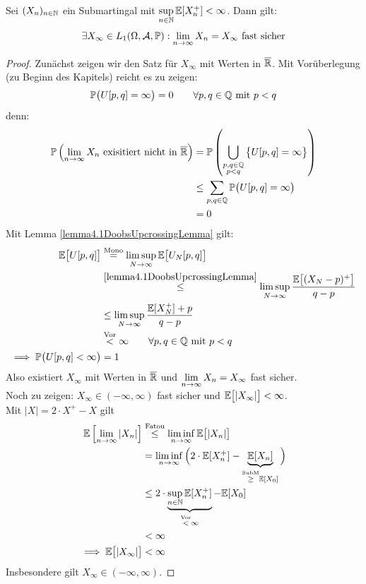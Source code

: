 \begin{theorem}[Martingalkonvergenz]\label{theorem4.2Martingalkonvergenz}\enter
Sei $(X_n)_{n\in\mathbb{N}}$ ein Submartingal mit $\sup\limits_{n\in\mathbb{N}}\mathbb{E}[X_n^+]<\infty$. Dann gilt:
\begin{align*}
\exists X_\infty\in L_1(\Omega,\mathcal{A},\mathbb{P}):\lim\limits_{n\to\infty} X_n=X_\infty\text{ fast sicher}
\end{align*}
\end{theorem}
\begin{proof}
Zunächst zeigen wir den Satz für $X_\infty$ mit Werten in $\overline{\mathbb{R}}$. Mit Vorüberlegung (zu Beginn des Kapitels) reicht es zu zeigen:
\begin{align*}
\mathbb{P}\big(U[p,q]=\infty\big)=0\qquad\forall p,q\in\mathbb{Q}\text{ mit } p<q
\end{align*}
denn:
\begin{align*}
\mathbb{P}\left(\lim\limits_{n\to\infty} X_n\text{ exisitiert nicht in }\overline{\mathbb{R}}\right)
&=\mathbb{P}\left(\bigcup\limits_{\begin{subarray}{c}p,q\in\mathbb{Q}\\ p<q\end{subarray}}\big\lbrace U[p,q]=\infty\big\rbrace\right)\\
&\leq\sum\limits_{p,q\in\mathbb{Q}}\mathbb{P}\big(U[p,q]=\infty\big)\\
&=0
\end{align*}
Mit Lemma \ref{lemma4.1DoobsUpcrossingLemma} gilt:
\begin{align*}
\mathbb{E}\big[U[p,q]\big]&\stackrel{\text{Mono}}{=}\limsup\limits_{N\to\infty}\mathbb{E}\big[U_N[p,q]\big]\\
&\stackrel{\ref{lemma4.1DoobsUpcrossingLemma}}{\leq}
\limsup\limits_{N\to\infty}\frac{\mathbb{E}\big[(X_N-p)^+\big]}{q-p}\\
&\leq\limsup\limits_{N\to\infty}\frac{\mathbb{E}[X_N^+]+p}{q-p}\\
&\stackrel{\text{Vor}}{<}
\infty\qquad\forall p,q\in\mathbb{Q}\text{ mit } p<q\\
\implies
\mathbb{P}\big(U[p,q]<\infty\big)&=1
\end{align*}
Also existiert $X_\infty$ mit Werten in $\overline{\mathbb{R}}$ und $\lim\limits_{n\to\infty} X_n=X_\infty$ fast sicher.\\
Noch zu zeigen: $X_\infty\in(-\infty,\infty)$ fast sicher und $\mathbb{E}\big[|X_\infty|\big]<\infty$.\\
Mit $|X|=2\cdot X^+-X$ gilt
\begin{align*}
\mathbb{E}\left[\lim\limits_{n\to\infty}|X_n|\right]
&\stackrel{\text{Fatou}}{\leq}
\liminf\limits_{n\to\infty}\mathbb{E}\big[|X_n|\big]\\
&=\liminf\limits_{n\to\infty}\Big(2\cdot\mathbb{E}[X_n^+]-\underbrace{\mathbb{E}[X_n]}_{\stackrel{\text{SubM}}{\geq}\mathbb{E}[X_0]}\Big)\\
&\leq
2\cdot\underbrace{\sup\limits_{n\in\mathbb{N}}\mathbb{E}[X_n^+]}_{\stackrel{\text{Vor}}{<}\infty}-\mathbb{E}[X_0]\\
&<\infty\\
\implies\mathbb{E}\big[|X_\infty|\big]&<\infty
\end{align*}
Insbesondere gilt $X_\infty\in(-\infty,\infty)$.
\end{proof}

